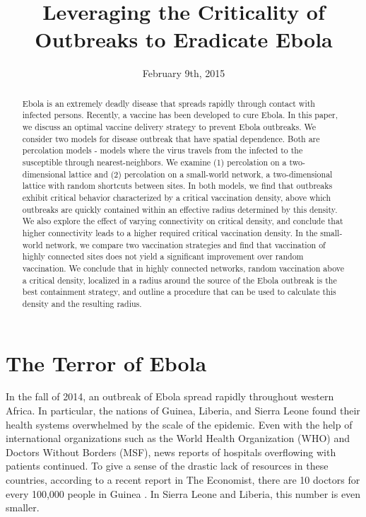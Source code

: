 \documentclass{article}
\title{Leveraging the Criticality of Outbreaks to Eradicate Ebola}
\author{}
\date{February 9th, 2015}
\begin{document}
\maketitle

\begin{abstract}


Ebola is an extremely deadly disease that spreads rapidly through contact with infected persons. Recently, a vaccine has been developed to cure Ebola. In this paper, we discuss an optimal vaccine delivery strategy to prevent Ebola outbreaks. We consider two models for disease outbreak that have spatial dependence. Both are percolation models - models where the virus travels from the infected to the susceptible through nearest-neighbors. We examine (1) percolation on a two-dimensional lattice and (2) percolation on a small-world network, a two-dimensional lattice with random shortcuts between sites. 
In both models, we find that outbreaks exhibit critical behavior characterized by a critical vaccination density, above which outbreaks are quickly contained within an effective radius determined by this density. We also explore the effect of varying connectivity on critical density, and conclude that higher connectivity leads to a higher required critical vaccination density. In the small-world network, we compare two vaccination strategies and find that vaccination of highly connected sites does not yield a significant improvement over random vaccination. We conclude that in highly connected networks, random vaccination above a critical density, localized in a radius around the source of the Ebola outbreak is the best containment strategy, and outline a procedure that can be used to calculate this density and the resulting radius.

\end{abstract}
\clearpage

\tableofcontents
\clearpage

\section{The Terror of Ebola}
In the fall of 2014, an outbreak of Ebola spread rapidly throughout western Africa. In particular, the nations of Guinea, Liberia, and Sierra Leone found their health systems overwhelmed by the scale of the epidemic. Even with the help of international organizations such as the World Health Organization (WHO) and Doctors Without Borders (MSF), news reports of hospitals overflowing with patients continued. To give a sense of the drastic lack of resources in these countries, according to a recent report in The Economist, there are 10 doctors for every 100,000 people in Guinea \cite{Economist}. In Sierra Leone and Liberia, this number is even smaller.
\end{document}
